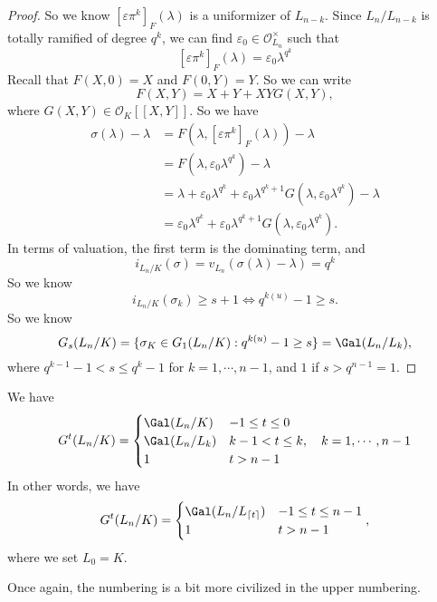 \documentclass[a4paper]{article}
\begin{document}
\begin{proof}
  So we know $[\varepsilon \pi^k]_F(\lambda)$ is a uniformizer of $L_{n - k}$. Since $L_n/L_{n - k}$ is totally ramified of degree $q^k$, we can find $\varepsilon_0 \in \mathcal{O}_{L_n}^\times$ such that
  \[
    [\varepsilon \pi^k]_F(\lambda) = \varepsilon_0 \lambda^{q^k} %
  \]
  Recall that $F(X, 0) = X$ and $F(0, Y) = Y$. So we can write
  \[
    F(X, Y) = X + Y + XYG(X, Y),
  \]
  where $G(X, Y) \in \mathcal{O}_K[[X, Y]]$. So we have
  \begin{align*}
    \sigma(\lambda) - \lambda &= F(\lambda, [\varepsilon \pi^k]_F (\lambda)) - \lambda\\
    &= F(\lambda, \varepsilon_0 \lambda^{q^k}) - \lambda\\
    &= \lambda + \varepsilon_0 \lambda^{q^k} + \varepsilon_0 \lambda^{q^k + 1} G(\lambda, \varepsilon_0 \lambda^{q^k}) - \lambda\\
    &= \varepsilon_0 \lambda^{q^k} + \varepsilon_0 \lambda^{q^k + 1} G(\lambda, \varepsilon_0 \lambda^{q^k}).
  \end{align*}
  In terms of valuation, the first term is the dominating term, and
  \[
    i_{L_n/K}(\sigma) = v_{L_n}(\sigma(\lambda) - \lambda) = q^k
  \]
  So we know
  \[
    i_{L_n/K}(\sigma_k) \geq s + 1 \Leftrightarrow q^{k(u)} - 1 \geq s.
  \]
  So we know
  \[
    G_s(L_n/K) = \{\sigma_K \in G_1(L_n/K): q^{k(u)} - 1 \geq s\} = \Gal(L_n/L_k),
  \]
  where $q^{k - 1} - 1 < s \leq q^k - 1$ for $k = 1, \cdots, n - 1$, and $1$ if $s > q^{n - 1} = 1$.
\end{proof}

\begin{cor}
  We have
  \[
    G^t(L_n/K) =
    \begin{cases}
      \Gal(L_n/K) & -1 \leq t \leq 0\\
      \Gal(L_n/L_k) & k - 1 < t \leq k,\quad k = 1, \cdots, n - 1\\
      1 & t > n - 1
    \end{cases}
  \]
  In other words, we have
  \[
    G^t(L_n/K) =
    \begin{cases}
      \Gal(L_n/L_{\lceil t\rceil}) & -1 \leq t \leq n - 1\\
      1 & t > n - 1
    \end{cases},
  \]
  where we set $L_0 = K$.
\end{cor}
Once again, the numbering is a bit more civilized in the upper numbering.
\end{document}
